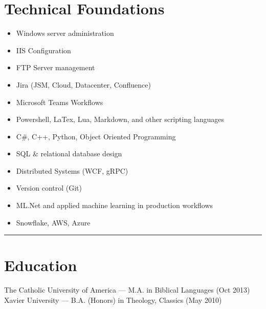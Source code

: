 \documentclass[12pt,letter]{article}
\newcommand\hrul{\noindent\rule{\linewidth}{0.4pt}}
\begin{document}
\section*{Technical Foundations}
\begin{itemize}[noitemsep]
\item Windows server administration
\item IIS Configuration
\item FTP Server management
\item Jira (JSM, Cloud, Datacenter, Confluence)
\item Microsoft Teams Workflows
\item Powershell, LaTex, Lua, Markdown, and other scripting languages
\item C\#, C++, Python, Object Oriented Programming
\item SQL \& relational database design
\item Distributed Systems (WCF, gRPC)
\item Version control (Git)
\item ML.Net and applied machine learning in production workflows
\item Snowflake, AWS, Azure
\end{itemize}
\hrul
\section*{Education}
The Catholic University of America --- M.A. in Biblical Languages (Oct 2013)\\
Xavier University --- B.A. (Honors) in Theology, Classics (May 2010)
\end{document}
